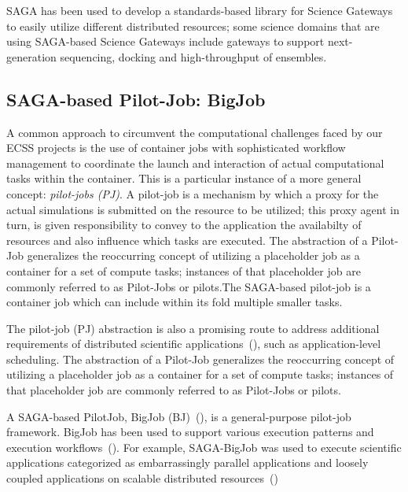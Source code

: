\documentclass{sig-alternate}
\begin{document}
SAGA has been used to develop a standards-based library for Science
Gateways to easily utilize different distributed resources; some
science domains that are using SAGA-based Science Gateways include
gateways to support next-generation sequencing, docking and
high-throughput of ensembles.


\subsection{SAGA-based Pilot-Job: BigJob}
\label{bigjob}
A common approach to circumvent the computational challenges faced by our ECSS
projects is the use of container jobs with sophisticated workflow management to
coordinate the launch and interaction of actual computational tasks within the
container. This is a particular instance of a more general
concept: \emph{pilot-jobs (PJ)}. A pilot-job is a mechanism by which a proxy
for the actual simulations is submitted on the resource to be
utilized; this proxy agent in turn, is given responsibility to convey
to the application the availabilty of resources and also influence
which tasks are executed. The abstraction of a Pilot-Job generalizes
the reoccurring concept of utilizing a placeholder job as a container
for a set of compute tasks; instances of that placeholder job are
commonly referred to as Pilot-Jobs or pilots.The SAGA-based pilot-job
is a container job which can include within its fold multiple smaller
tasks.

The pilot-job (PJ) abstraction is also a promising route to address
additional requirements of distributed scientific
applications~(\cite{ko-efficient,bigjob_cloudcom10}), such as
application-level scheduling. The abstraction of a Pilot-Job
generalizes the reoccurring concept of utilizing a placeholder job
as a container for a set of compute tasks; instances of that
placeholder job are commonly referred to as Pilot-Jobs or pilots.

A SAGA-based PilotJob, BigJob (BJ)~(\cite{bigjob_web,saga_bigjob_condor_cloud}),
is a general-purpose pilot-job framework. BigJob has been used to support
various execution patterns and execution
workflows~(\cite{async_repex11,repex_ptrsa}). For example, SAGA-BigJob was used
to execute scientific applications categorized as embarrassingly parallel
applications and loosely coupled applications on scalable distributed
resources~(\cite{ecmls_ccpe10, dare-ecmls11})
\end{document}
